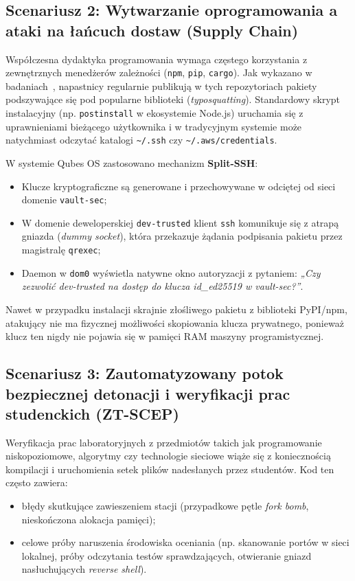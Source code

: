 \subsection{Scenariusz 2: Wytwarzanie oprogramowania a ataki na łańcuch dostaw (Supply Chain)}
Współczesna dydaktyka programowania wymaga częstego korzystania z zewnętrznych menedżerów zależności (\texttt{npm}, \texttt{pip}, \texttt{cargo}). Jak wykazano w badaniach~\cite{pastrana2023malware}, napastnicy regularnie publikują w tych repozytoriach pakiety podszywające się pod popularne biblioteki (\textit{typosquatting}). Standardowy skrypt instalacyjny (np. \texttt{postinstall} w ekosystemie Node.js) uruchamia się z uprawnieniami bieżącego użytkownika i w tradycyjnym systemie może natychmiast odczytać katalogi \texttt{\textasciitilde/.ssh} czy \texttt{\textasciitilde/.aws/credentials}.

W systemie Qubes OS zastosowano mechanizm \textbf{Split-SSH}:
\begin{itemize}
    \item Klucze kryptograficzne są generowane i przechowywane w odciętej od sieci domenie \texttt{vault-sec};
    \item W domenie deweloperskiej \texttt{dev-trusted} klient \texttt{ssh} komunikuje się z atrapą gniazda (\textit{dummy socket}), która przekazuje żądania podpisania pakietu przez magistralę \texttt{qrexec};
    \item Daemon w \texttt{dom0} wyświetla natywne okno autoryzacji z pytaniem: \textit{„Czy zezwolić dev-trusted na dostęp do klucza id\_ed25519 w vault-sec?”}.
\end{itemize}
Nawet w przypadku instalacji skrajnie złośliwego pakietu z biblioteki PyPI/npm, atakujący nie ma fizycznej możliwości skopiowania klucza prywatnego, ponieważ klucz ten nigdy nie pojawia się w pamięci RAM maszyny programistycznej.

\subsection{Scenariusz 3: Zautomatyzowany potok bezpiecznej detonacji i weryfikacji prac studenckich (ZT-SCEP)}
Weryfikacja prac laboratoryjnych z przedmiotów takich jak programowanie niskopoziomowe, algorytmy czy technologie sieciowe wiąże się z koniecznością kompilacji i uruchomienia setek plików nadesłanych przez studentów. Kod ten często zawiera:
\begin{itemize}
    \item błędy skutkujące zawieszeniem stacji (przypadkowe pętle \textit{fork bomb}, nieskończona alokacja pamięci);
    \item celowe próby naruszenia środowiska oceniania (np. skanowanie portów w sieci lokalnej, próby odczytania testów sprawdzających, otwieranie gniazd nasłuchujących \textit{reverse shell}).
\end{itemize}

